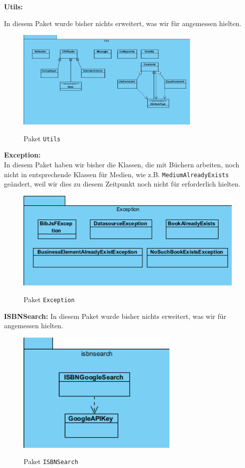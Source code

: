\documentclass[fontsize=12pt,paper=a4,twoside]{scrartcl}
\begin{document}
\textbf{Utils:}

In diesem Paket wurde bisher nichts erweitert, was wir für angemessen hielten.
\begin{figure} [H] 
\caption{Paket \texttt{Utils}} \centering
 \includegraphics[width=0.8\textwidth]{Diagramme/Utils.png} 
 \label{Utils} 
\end{figure}
\newpage
\textbf{Exception:} \\
In diesem Paket haben wir bisher die Klassen, die mit Büchern arbeiten, noch nicht in entsprechende Klassen für Medien, wie z.B. \texttt{MediumAlreadyExists} geändert, weil wir dies zu diesem Zeitpunkt noch nicht für erforderlich hielten.
\begin{figure} [H] 
\caption{Paket \texttt{Exception}} \centering
 \includegraphics[width=1\textwidth]{Diagramme/exception.png} 
 \label{Exception} 
\end{figure}

\textbf{ISBNSearch:}
In diesem Paket wurde bisher nichts erweitert, was wir für angemessen hielten.
\begin{figure} [H] 
\caption{Paket \texttt{ISBNSearch}} \centering
 \includegraphics[width=0.7\textwidth]{Diagramme/ISBNSearch.png} 
 \label{ISBNSearch} 
\end{figure}
\end{document}
